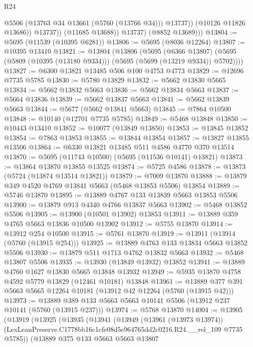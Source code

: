 \begin{lexlean}{R24}
\begin{coremodule}
                      @5506
                      (@13763 @34 @13661 (@5760 (@13766 @34)))
                      @13737))
                  (@10126 @11826 @13686))
                @13737))
            (@11685 @13688))
          @13737)
        (@8852 @13689)))
@13804 := @5695 (@11539 (@10395 @6281))
@13806 := @5695 (@8036 @12264)
@13807 := @10395 @13410
@13821 := @13804
    (@13806
      (@5695
        (@6366 @13807)
        (@5695 (@5809 (@10395 (@13180 @9334))) (@5695 (@5699 (@13219 @9334)) @5702))))
@13827 := @6300 @13821 @13485 @506 @100 @4753 @4773
@13829 := @12696 @7735 @5785
@13830 := @5780 @13829
@13832 := @5662 @13830 @5665
@13834 := @5662 @13832 @5663
@13836 := @5662 @13834 @5663
@13837 := @5664 @13836
@13839 := @5662 @13837 @5663
@13841 := @5662 @13839 @5663
@13844 := @5677 (@5662 @13841 @5663)
@13845 := @7864 @10500
@13848 := @10140 (@12701 @7735 @5785)
@13849 := @5468 @13848
@13850 := @10443 @13410
@13852 := @10077 (@13849 @13850)
@13853 := @13845 @13852
@13854 := @7863 @13853
@13855 := @13844 @13854
@13857 := @13827 @13855 @13506
@13864 := @6330 @13821 @13485 @511 @4586 @4770 @370 @13514
@13870 := @5695 (@11743 @10500) (@5695 (@11536 @10141) @13821)
@13873 := @13864 @13870 @13855 @13525
@13874 := @5725 @4586
@13878 := @13873 (@5724 (@13874 @13514 @13821))
@13879 := @7009 @13870
@13888 := @13879 @349 @4520 @4769 @13841 @5663 (@5468 @13853 @5506) @13854
@13889 := @5746 @13870
@13895 := @13889 @4767 @133 @13839 @5663 @13853 @5506
@13900 := @13879 @913 @4340 @4766 @13837 @5663
@13902 := @5468 @13852 @5506
@13905 := @13900 (@10501 @13902) @13853
@13911 := @13889 @359 @4765 @5663 @13836 @10500 @13902
@13912 := @5755 @13870
@13914 := @13912 @254 @10500
@13915 := @5761 @13870
@13919 := @13911 (@13914 (@5760 (@13915 @254)))
@13925 := @13889 @4763 @133 @13834 @5663 @13852 @5506
@13930 := @13879 @511 @1713 @4762 @13832 @5663
@13932 := @5468 @13807 @5506
@13935 := @13930 (@13849 @13932) @13852
@13941 := @13889 @4760 @1627 @13830 @5665 @13848 @13932
@13949 := @5935 @13870 @4758 @4592 @5779 @13829 (@12461 @10181) @13848
@13961 := @13889 @377 @391 @5663 @5665 @12264 @10181 (@13912 @42 @12264 (@5760 (@13915 @42)))
@13973 := @13889 @389 @133 @5663 @5663 @10141 @5506 (@13912 @237 @10141 (@5760 (@13915 @237)))
@13974 := @5768 @13870
@14004 := @13905
    (@13919
      (@13925
        (@13935
          (@13941
            (@13949
              (@13961 (@13973 @13974))
              (LexLeanPreserve.C1778bb16c1cfe08d5e964765dd2c0216.R24.__rel_109 @7735 @5785))
            (@13889
              @375
              @133
              @5663
              @5663
              @13807

\end{coremodule}
\end{lexlean}
